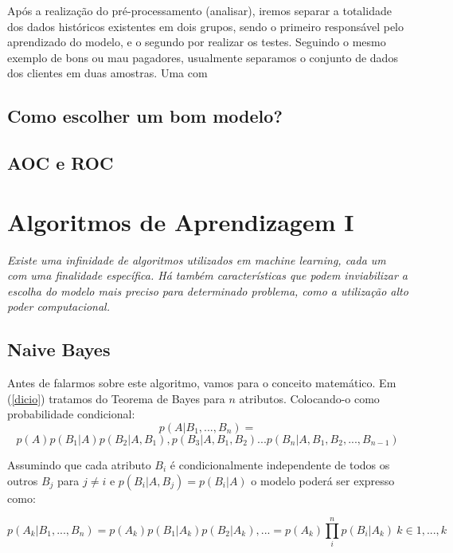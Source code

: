 \documentclass[
]{book}
\begin{document}
Após a realização do pré-processamento (analisar), iremos separar a totalidade dos dados históricos existentes em dois grupos, sendo o primeiro responsável pelo aprendizado do modelo, e o segundo por realizar os testes.
Seguindo o mesmo exemplo de bons ou mau pagadores, usualmente separamos o conjunto de dados dos clientes em duas amostras. Uma com

\hypertarget{como-escolher-um-bom-modelo}{%
\section{Como escolher um bom modelo?}\label{como-escolher-um-bom-modelo}}

\hypertarget{aocroc}{%
\section{AOC e ROC}\label{aocroc}}

\hypertarget{Algoritmosaprendizagem}{%
\chapter{Algoritmos de Aprendizagem I}\label{Algoritmosaprendizagem}}

\emph{Existe uma infinidade de algoritmos utilizados em machine learning, cada um com uma finalidade específica. Há também características que podem inviabilizar a escolha do modelo mais preciso para determinado problema, como a utilização alto poder computacional.}

\hypertarget{naive-bayes}{%
\section{Naive Bayes}\label{naive-bayes}}

Antes de falarmos sobre este algoritmo, vamos para o conceito matemático. Em (\ref{dicio}) tratamos do Teorema de Bayes para \(n\) atributos. Colocando-o como probabilidade condicional:
\[p(A|B_{1},...,B_{n}) = \]
\begin{equation} 
  p(A)p(B_{1}|A)p(B_{2}|A,B_{1}),p(B_{3}|A,B_{1},B_{2})...p(B_{n}|A,B_{1},B_{2},...,B_{n−1})
  \label{eq:bayescond}
\end{equation}

Assumindo que cada atributo \(B_i\) é condicionalmente independente de todos os outros \(B_j\) para \(j\neq i\) e \(p(B_i|A,B_j)=p(B_i|A)\) o modelo poderá ser expresso como:

\begin{equation} 
  p(A_k|B_1,...,B_n)=p(A_k)p(B_1|A_k)p(B_2|A_k),...=p(A_k)\prod_i^n p(B_i|A_k) \ k ∈{1,...,k}
  \label{eq:bayesprodutorio}
\end{equation}
\end{document}
